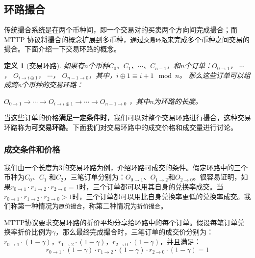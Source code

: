 \documentclass[UTF8,nofonts]{ctexart}
\newtheorem{definition}{定义}[section]
\begin{document}
\subsection{环路撮合}

传统撮合系统是在两个币种间，即一个交易对的买卖两个方向间完成撮合；而MTTP 协议将撮合的概念扩展到多币种，通过\texttt{交易环路}来完成多个币种之间交易的撮合。下面介绍一下交易环路的概念。

\begin{definition}[交易环路]
如果有$n$个币种$C_{0}$、$C_{1}$、$\cdots$、$C_{n-1}$，和$n$个订单：$O_{0\rightarrow 1}$， $\cdots$， $O_{i\rightarrow i\oplus 1}$， $\cdots$， $O_{n-1 \rightarrow 0}$，其中，$i\oplus 1 \equiv i+1 \mod n$。
那么这些订单可以组成跨n个币种的交易环路：

$O_{0\rightarrow 1} \rightarrow \cdots \rightarrow O_{i\rightarrow i\oplus 1} \rightarrow \cdots \rightarrow O_{n-1\rightarrow 0}$ ，其中$n$为环路的长度。
\end{definition}

当这些订单的价格\textbf{满足一定条件时}，我们可以对整个交易环路进行撮合，这种交易环路称为\textbf{可交易环路}。下面我们对交易环路中的成交价格和成交量进行讨论。


\subsubsection{成交条件和价格\label{sec:matchprice}}

我们由一个长度为3的交易环路为例，介绍环路可成交的条件。假定环路中的三个币种为$C_{0}$、$C_{1}$ 和$C_{2}$，三笔订单分别为：$O_{0\rightarrow 1}$、$O_{1 \rightarrow 2}$和$O_{2 \rightarrow 0}$。很容易证明，如果$r_{0 \rightarrow 1} \cdot r_{1 \rightarrow 2}\cdot r_{2 \rightarrow 0} = 1$时，三个订单都可以用其自身的兑换率成交。当$r_{0 \rightarrow 1} \cdot r_{1 \rightarrow 2}\cdot r_{2 \rightarrow 0} > 1$时，三个订单都可以用比自身兑换率更低的兑换率成交。我们称第一种情况为\texttt{原价撮合}，称第二种情况为\texttt{折价撮合}。

MTTP协议要求交易环路的折价平均分享给环路中的每个订单。假设每笔订单兑换率折价比例为$\gamma$，那么最终完成撮合时，三笔订单的成交价分别为：$r_{0\rightarrow 1} \cdot (1-\gamma)$，$r_{1\rightarrow 2} \cdot (1-\gamma)$，$r_{2 \rightarrow 0} \cdot (1-\gamma)$，并且满足：
\begin{equation}
r_{0\rightarrow 1} \cdot (1-\gamma)\cdot r_{1\rightarrow 2} \cdot (1-\gamma) \cdot r_{2 \rightarrow 0} \cdot (1-\gamma) = 1
\end{equation}
\end{document}
